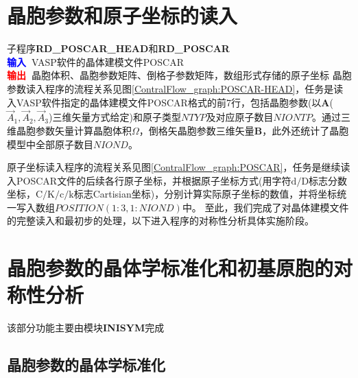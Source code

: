 \section{晶胞参数和原子坐标的读入}
子程序\textbf{RD\_POSCAR\_HEAD}和\textbf{RD\_POSCAR}\\
\textbf{\textcolor{blue}{输入~}}\textrm{VASP}软件的晶体建模文件\textrm{POSCAR}\\
\textbf{\textcolor{red}{输出~}}晶胞体积、晶胞参数矩阵、倒格子参数矩阵，数组形式存储的原子坐标
晶胞参数读入程序的流程关系见图\ref{ContralFlow_graph:POSCAR-HEAD}，任务是读入\textrm{VASP}软件指定的晶体建模文件\textrm{POSCAR}格式的前7行，包括晶胞参数(以$\mathbf{A}$($\vec A_1,\vec A_2,\vec A_3$)三维矢量方式给定)和原子类型$\mathit{NTYP}$及对应原子数目$\mathit{NIONTP}$。通过三维晶胞参数矢量计算晶胞体积$\Omega$，倒格矢晶胞参数三维矢量$\mathbf{B}$，此外还统计了晶胞模型中全部原子数目$\mathit{NIOND}$。

原子坐标读入程序的流程关系见图\ref{ContralFlow_graph:POSCAR}，任务是继续读入\textrm{POSCAR}文件的后续各行原子坐标，并根据原子坐标方式(用字符$\mathrm{d/D}$标志分数坐标，$\mathrm{C/K/c/k}$标志\textrm{Cartisian}坐标)，分别计算实际原子坐标的数值，并将坐标统一写入数组$\mathit{POSITION}(1:3,1:\mathit{NIOND})$中。
至此，我们完成了对晶体建模文件的完整读入和最初步的处理，以下进入程序的对称性分析具体实施阶段。

\section{晶胞参数的晶体学标准化和初基原胞的对称性分析}
该部分功能主要由模块\textbf{INISYM}完成
\subsection{晶胞参数的晶体学标准化}

